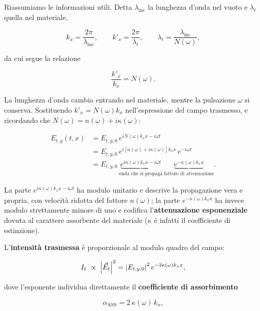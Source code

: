 \begin{solution}
Riassumiamo le informazioni utili. Detta \( \lambda_{\text{inc}} \) la lunghezza d'onda nel vuoto e \( \lambda_t \) quella nel materiale,

\begin{equation}
    k_x = \frac{2\pi}{\lambda_{\text{inc}}}, \qquad k'_x = \frac{2\pi}{\lambda_t}, \qquad \lambda_t = \frac{\lambda_{\text{inc}}}{N(\omega)},
\end{equation}

da cui segue la relazione

\begin{equation}
    \frac{k'_x}{k_x} = N(\omega).
\end{equation}

La lunghezza d'onda cambia entrando nel materiale, mentre la pulsazione \( \omega \) si conserva. Sostituendo \( k'_x = N(\omega) k_x \) nell'espressione del campo trasmesso, e ricordando che \( N(\omega) = n(\omega) + i \kappa(\omega) \):

\begin{align}
    E_{t,y}(t, x) &= E_{t,y,0} \, e^{i N(\omega) k_x x - i \omega t} \\
                  &= E_{t,y,0} \, e^{i [n(\omega) + i \kappa(\omega)] k_x x} \, e^{- i \omega t} \\
                  &= E_{t,y,0} \, \underbrace{e^{i n(\omega) k_x x - i \omega t}}_{\text{onda che si propaga}} \, \underbrace{e^{- \kappa(\omega) k_x x}}_{\text{fattore di attenuazione}}.
\end{align}

La parte \( e^{i n(\omega) k_x x - i \omega t} \) ha modulo unitario e descrive la propagazione vera e propria, con velocità ridotta del fattore \( n(\omega) \); la parte \( e^{- \kappa(\omega) k_x x} \) ha invece modulo strettamente minore di uno e codifica l'\textbf{attenuazione esponenziale} dovuta al carattere assorbente del materiale (\( \kappa \) è infatti il coefficiente di estinzione).

L'\textbf{intensità trasmessa} è proporzionale al modulo quadro del campo:

\begin{equation}
    I_t \;\propto\; \abs{\vec{E}_t}^{2} = \abs{E_{t,y,0}}^{2} \, e^{- 2 \kappa(\omega) k_x x},
\end{equation}

dove l'esponente individua direttamente il \textbf{coefficiente di assorbimento}

\begin{importantbox}
    \begin{equation}
        \alpha_{\text{ASS}} = 2 \, \kappa(\omega) \, k_x,
    \end{equation}
\end{importantbox}


\end{solution}
